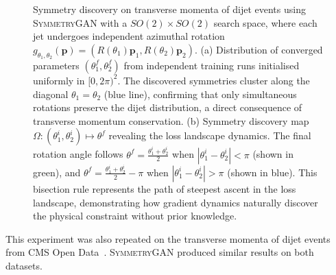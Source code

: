 \begin{figure}
\begin{subfigure}[b]{0.4\textwidth}
        \caption{}
        \label{fig:LHCO_ii}
    \end{subfigure}
    \caption{Symmetry discovery on transverse momenta of dijet events using \textsc{SymmetryGAN} with a $SO(2) \times SO(2)$ search space, where each jet undergoes independent azimuthal rotation $g_{\theta_1,\theta_2}(\mathbf{p}) = (R(\theta_1)\mathbf{p}_1, R(\theta_2)\mathbf{p}_2)$. (a) Distribution of converged parameters $(\theta_1^f, \theta_2^f)$ from independent training runs initialised uniformly in $[0, 2\pi)^2$. The discovered symmetries cluster along the diagonal $\theta_1 = \theta_2$ (blue line), confirming that only simultaneous rotations preserve the dijet distribution, a direct consequence of transverse momentum conservation. (b) Symmetry discovery map $\Omega: (\theta_1^i, \theta_2^i) \mapsto \theta^f$ revealing the loss landscape dynamics. The final rotation angle follows $\theta^f = \frac{\theta_1^i + \theta_2^i}{2}$ when $|\theta_1^i - \theta_2^i| < \pi$ (shown in green), and $\theta^f = \frac{\theta_1^i + \theta_2^i}{2} - \pi$ when $|\theta_1^i - \theta_2^i| > \pi$ (shown in blue). This bisection rule represents the path of steepest ascent in the loss landscape, demonstrating how gradient dynamics naturally discover the physical constraint without prior knowledge.}
    \label{fig:LHCO}
\end{figure}
           This experiment was also repeated on the transverse momenta of dijet events from CMS Open Data~\cite{komiske_cms_2019}.
           \textsc{SymmetryGAN} produced similar results on both datasets.
            

